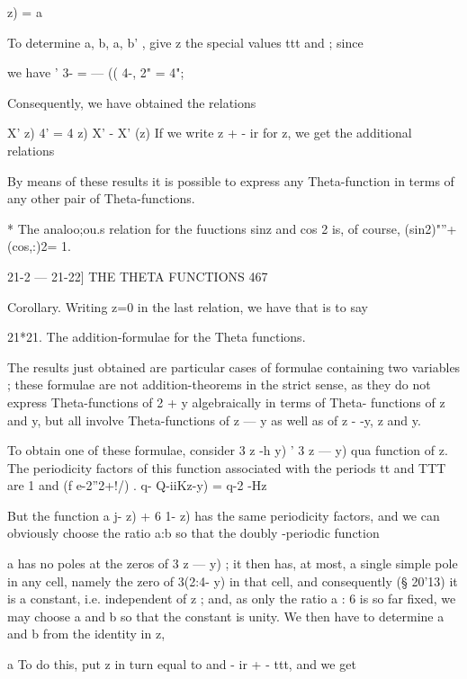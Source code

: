      z) = a%

To determine a, b, a, b' , give z the special values   ttt and ; since 

we have ' 3- = — (( 4-,  2" =  4"; %

Consequently, we have obtained the relations 

X'  z)  4' =  4   z) X' - X' (z) %
If we write z + - ir for z, we get the additional relations 

By means of these results it is possible to express any Theta-function in 
terms of any other pair of Theta-functions. 

* The analoo;ou.s relation for the fuuctions sinz and cos 2 is, of course, (sin2)"''+(cos,:)2= 1. 



21-2 — 21-22] THE THETA FUNCTIONS 467 

Corollary. Writing z=0 in the last relation, we have 
that is to say 

21*21. The addition-formulae for the Theta functions. 

The results just obtained are particular cases of formulae containing two 
variables ; these formulae are not addition-theorems in the strict sense, as 
they do not express Theta-functions of 2 + y algebraically in terms of Theta- 
functions of z and y, but all involve Theta-functions of z — y as well as of 
z - -y, z and y. 

To obtain one of these formulae, consider  3  z -h y) ' 3  z — y) qua function 
of z. The periodicity factors of this function associated with the periods tt 
and TTT are 1 and (f  e-2''2+!/) . q-  Q-iiKz-y) = q-2  -Hz  

But the function a j-  z) + 6 1-  z) has the same periodicity factors, and 
we can obviously choose the ratio a:b so that the doubly -periodic function 

a%
has no poles at the zeros of  3  z — y) ; it then has, at most, a single simple 
pole in any cell, namely the zero of  3(2:4- y) in that cell, and consequently 
(§ 20'13) it is a constant, i.e. independent of z ; and, as only the ratio a : 6 is 
so far fixed, we may choose a and b so that the constant is unity. 
We then have to determine a and b from the identity in z, 

a%
To do this, put z in turn equal to and - ir + -  ttt, and we get 

